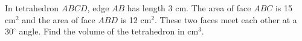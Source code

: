 In tetrahedron $ABCD$, edge $AB$ has length 3 cm.  The area of face $ABC$ is 15 $\text{cm}^2$ and the area of face $ABD$ is 12 $\text{cm}^2$.  These two faces meet each other at a $30^\circ$ angle.  Find the volume of the tetrahedron in $\text{cm}^3$.
